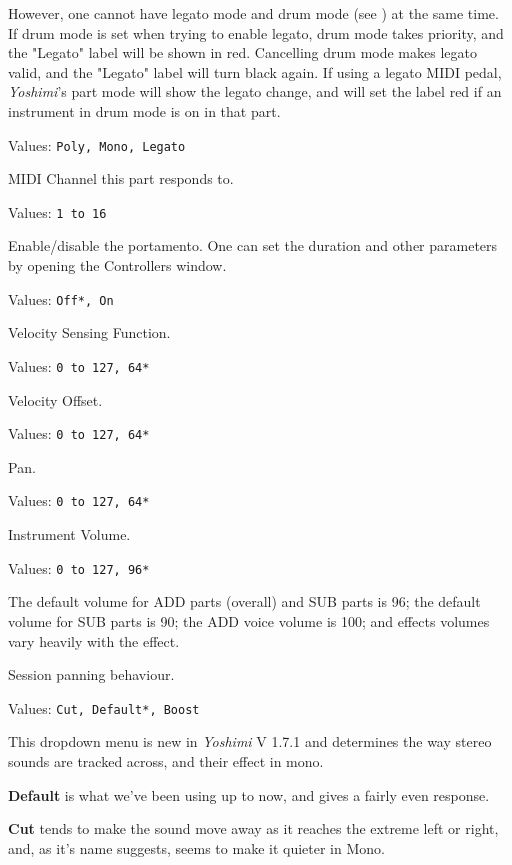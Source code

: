 	However, one cannot have legato mode and drum mode
	(see )
   at the same time.
   If drum mode is set when trying to enable legato,
   drum mode takes priority, and the "Legato" label will be shown in red.
   Cancelling drum mode makes legato valid, and the "Legato" label
   will turn black again.
   If using a legato MIDI pedal, \textsl{Yoshimi}'s part mode will show
   the legato change, and will set the label red if an instrument in drum mode
   is on in that part.

   Values: \texttt{Poly, Mono, Legato}

   MIDI Channel this part responds to.

   Values: \texttt{1 to 16}

   Enable/disable the portamento.
   One can set the duration and other parameters by opening the Controllers
   window.

   Values: \texttt{Off*, On}

   Velocity Sensing Function.

   Values: \texttt{0 to 127, 64*}

   Velocity Offset.

   Values: \texttt{0 to 127, 64*}

   Pan.

   Values: \texttt{0 to 127, 64*}

   Instrument Volume.

   Values: \texttt{0 to 127, 96*}

   The default volume for ADD parts (overall) and SUB parts is 96; the
   default volume for SUB parts is 90; the ADD voice volume is 100; and
   effects volumes vary heavily with the effect.

   Session panning behaviour.

   Values: \texttt{Cut, Default*, Boost}

   This dropdown menu is new in \textsl{Yoshimi} V 1.7.1 and determines the way
   stereo sounds are tracked across, and their effect in mono.

   \textbf{Default} is what we've been using up to now, and gives a fairly even
   response.

   \textbf{Cut} tends to make the sound move away as it reaches the extreme left
   or right, and, as it's name suggests, seems to make it quieter in Mono.

